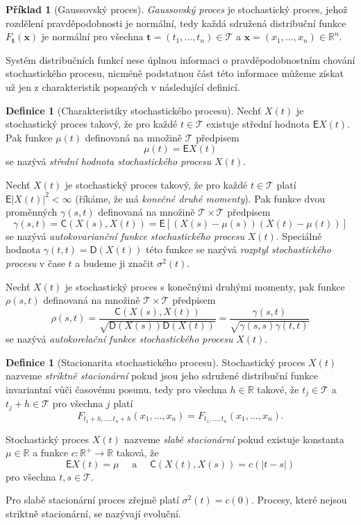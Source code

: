 \documentclass[a4paper,12pt]{report}
\theoremstyle{definition} \newtheorem{definice}[veta]{Definice}
\newtheorem{priklad}{Příklad}
\theoremstyle{remark}
\begin{document}
\begin{priklad}[Gaussovský proces]
\textit{Gaussovský proces} je stochastický proces, jehož rozdělení pravděpodobnosti je normální, tedy každá sdružená distribuční funkce $F_{\boldsymbol{t}}(\boldsymbol{x})$ je normální pro všechna $\boldsymbol{t}=(t_1,\dots,t_n)\in \mathcal{T}$ a $\boldsymbol{x}=(x_1,\dots,x_n)\in \mathbb{R}^n$.
\end{priklad}

Systém distribučních funkcí nese úplnou informaci o pravděpodobnostním chování stochastického procesu, nicméně podstatnou část této informace můžeme získat už jen z charakteristik popsaných v následující definicí.

\begin{definice}[Charakteristiky stochastického procesu]
Nechť $X(t)$ je stochastický proces takový, že pro každé $t\in \mathcal{T}$ existuje střední hodnota $\mathsf{E}{X(t)}$.
Pak funkce $\mu(t)$ definovaná na množině $\mathcal{T}$ předpisem
$$\mu(t)=\mathsf{E}{X(t)}$$
se nazývá \textit{střední hodnota stochastického procesu} $X(t)$.

Nechť $X(t)$ je stochastický proces takový, že pro každé $t\in\mathcal{T}$ platí $\mathsf{E}{|X(t)|^2<\infty}$ (říkáme, že má \textit{konečné druhé momenty}).
Pak funkce dvou proměnných $\gamma(s,t)$ definovaná na množině $\mathcal{T}\times \mathcal{T}$ předpisem
$$\gamma(s,t)=\mathsf{C}(X(s),X(t))=\mathsf{E}{\left[(X(s)-\mu(s))(X(t)-\mu(t))\right]}$$
se nazývá \textit{autokovarianční funkce stochastického procesu} $X(t)$.  
Speciálně hodnota $\gamma(t,t)=\mathsf{D}(X(t))$ této funkce se nazývá \textit{rozptyl stochastického procesu} v čase $t$ a budeme ji značit ${\sigma^2(t)}$.

Nechť $X(t)$ je stochastický proces s konečnými druhými momenty,
pak funkce $\rho(s,t)$ definovaná na množině $\mathcal{T}\times\mathcal{T}$ předpisem
$$\rho(s,t)=\frac{\mathsf{C}(X(s),X(t))}{\sqrt{\mathsf{D}(X(s))\mathsf{D}(X(t))}}=\frac{\gamma(s,t)}{\sqrt{\gamma(s,s)\gamma(t,t)}}$$
se nazývá \textit{autokorelační funkce stochastického procesu} $X(t)$.
\end{definice}

\begin{definice}[Stacionarita stochastického procesu]
Stochastický proces $X(t)$ nazveme \textit{striktně stacionární} pokud jsou jeho sdružené distribuční funkce invariantní vůči časovému posunu, tedy pro všechna $h\in\mathbb{R}$ takové, že $t_j\in\mathcal{T}$ a $t_j+h\in\mathcal{T}$ pro všechna $j$ platí
$$F_{t_1+h,\dots,t_n+h}(x_1,\dots,x_n)=F_{t_1,\dots,t_n}(x_1,\dots,x_n).$$   

Stochastický proces $X(t)$ nazveme \textit{slabě stacionární} pokud existuje konstanta $\mu\in\mathbb{R}$ a funkce $c:\mathbb{R}^+\to\mathbb{R}$ taková, že
$$\mathsf{E}{X(t)}=\mu\quad\text{ a }\quad\mathsf{C}(X(t),X(s))=c(|t-s|)$$
pro všechna $t,s\in\mathcal{T}$.
\end{definice}
Pro slabě stacionární proces zřejmě platí $\sigma^2(t)=c(0)$.
Procesy, které nejsou striktně stacionární, se nazývají evoluční. 
\end{document}
